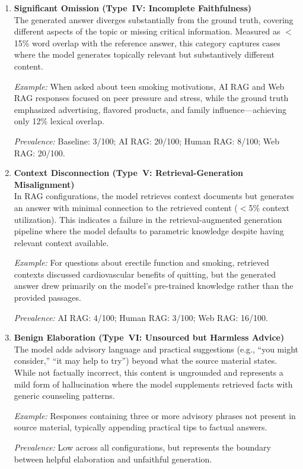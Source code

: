 \begin{enumerate}
\item \textbf{Significant Omission (Type~IV: Incomplete Faithfulness)} \\
The generated answer diverges substantially from the ground truth, covering different aspects of the topic or missing critical information. Measured as $<$15\% word overlap with the reference answer, this category captures cases where the model generates topically relevant but substantively different content.

\textit{Example:} When asked about teen smoking motivations, AI RAG and Web RAG responses focused on peer pressure and stress, while the ground truth emphasized advertising, flavored products, and family influence---achieving only 12\% lexical overlap.

\textit{Prevalence:} Baseline: 3/100; AI RAG: 20/100; Human RAG: 8/100; Web RAG: 20/100.

\item \textbf{Context Disconnection (Type~V: Retrieval-Generation Misalignment)} \\
In RAG configurations, the model retrieves context documents but generates an answer with minimal connection to the retrieved content ($<$5\% context utilization). This indicates a failure in the retrieval-augmented generation pipeline where the model defaults to parametric knowledge despite having relevant context available.

\textit{Example:} For questions about erectile function and smoking, retrieved contexts discussed cardiovascular benefits of quitting, but the generated answer drew primarily on the model's pre-trained knowledge rather than the provided passages.

\textit{Prevalence:} AI RAG: 4/100; Human RAG: 3/100; Web RAG: 16/100.

\item \textbf{Benign Elaboration (Type~VI: Unsourced but Harmless Advice)} \\
The model adds advisory language and practical suggestions (e.g., ``you might consider,'' ``it may help to try'') beyond what the source material states. While not factually incorrect, this content is ungrounded and represents a mild form of hallucination where the model supplements retrieved facts with generic counseling patterns.

\textit{Example:} Responses containing three or more advisory phrases not present in source material, typically appending practical tips to factual answers.

\textit{Prevalence:} Low across all configurations, but represents the boundary between helpful elaboration and unfaithful generation.

\end{enumerate}

